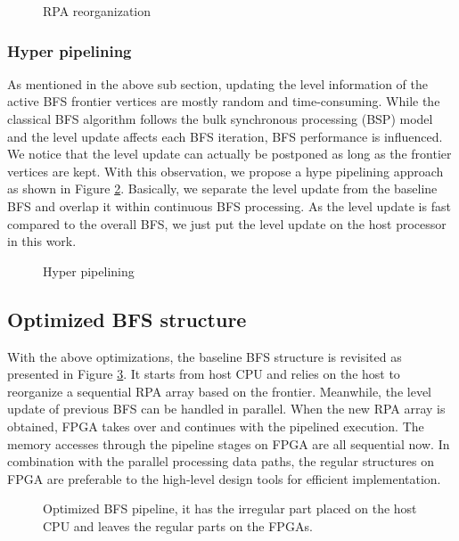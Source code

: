 \begin{figure}
    \caption{RPA reorganization}
\label{fig:reorg}
\vspace{-1em}
\end{figure}

\subsubsection{Hyper pipelining}
As mentioned in the above sub section, updating the level information of the active 
BFS frontier vertices are mostly random and time-consuming. While the classical BFS 
algorithm follows the bulk synchronous processing (BSP) model and the level update
affects each BFS iteration, BFS performance is influenced. We notice that the level update 
can actually be postponed as long as the frontier vertices are kept. With this observation, 
we propose a hype pipelining approach as shown in Figure \ref{fig:hyper}. Basically, 
we separate the level update from the baseline BFS and overlap it within continuous BFS processing.  
As the level update is fast compared to the overall BFS, we just put the level update on the 
host processor in this work.
\begin{figure}
	\caption{Hyper pipelining}
\label{fig:hyper}
\end{figure}

\subsection{Optimized BFS structure}
With the above optimizations, the baseline BFS structure is revisited  
as presented in Figure \ref{fig:opt-bfs}. It starts from host CPU and relies on the host 
to reorganize a sequential RPA array based on the frontier. Meanwhile, 
the level update of previous BFS can be handled in parallel. When the new RPA array is obtained, 
FPGA takes over and continues with the pipelined execution. The memory accesses through the 
pipeline stages on FPGA are all sequential now. In combination with the parallel 
processing data paths, the regular structures on FPGA are preferable to the high-level design 
tools for efficient implementation.
\begin{figure}
    \caption{Optimized BFS pipeline, it has the irregular part placed on the host CPU and 
	leaves the regular parts on the FPGAs.}
\label{fig:opt-bfs}
\vspace{-1em}
\end{figure}


